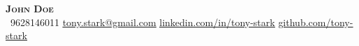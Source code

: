 \begin{center}
    \textbf{\Huge \scshape John Doe} \\ \vspace{1pt}
     \ \small 9628146011 \quad
    \href{mailto:tony.stark@gmail.com}{ \underline{tony.stark@gmail.com}} \quad
    \href{https://www.linkedin.com/in/tony-stark}{ \underline{linkedin.com/in/tony-stark}} \quad
    \href{https://github.com/tony-stark}{ \underline{github.com/tony-stark}}
\end{center}